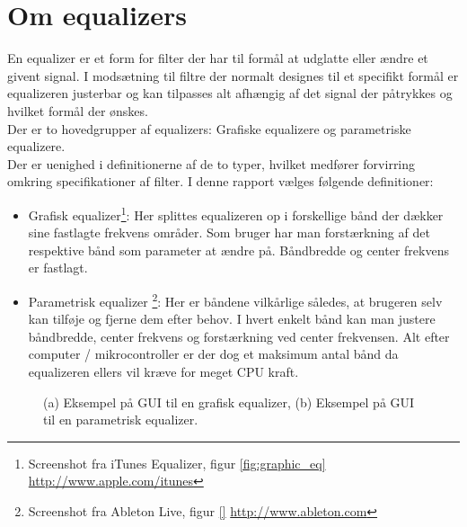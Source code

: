 \section{Om equalizers}\label{sec:equalizer}

En equalizer er et form for filter der har til formål at udglatte eller ændre et givent signal. I modsætning til filtre der normalt designes til et specifikt formål er equalizeren justerbar og kan tilpasses alt afhængig af det signal der påtrykkes og hvilket formål der ønskes.\\

Der er to hovedgrupper af equalizers: Grafiske equalizere og parametriske equalizere.\\
Der er uenighed i definitionerne af de to typer, hvilket medfører forvirring omkring specifikationer af filter. I denne rapport vælges følgende definitioner:

\begin{itemize}
	\item Grafisk equalizer\footnote{Screenshot fra iTunes Equalizer, figur \ref{fig:graphic_eq} \url{http://www.apple.com/itunes}}: Her splittes equalizeren op i forskellige bånd der dækker sine fastlagte frekvens områder. Som bruger har man forstærkning af det respektive bånd som parameter at ændre på. Båndbredde og center frekvens er fastlagt.
	\item Parametrisk equalizer \footnote{Screenshot fra Ableton Live, figur \ref{} \url{http://www.ableton.com}}: Her er båndene vilkårlige således, at brugeren selv kan tilføje og fjerne dem efter behov. I hvert enkelt bånd kan man justere båndbredde, center frekvens og forstærkning ved center frekvensen. Alt efter computer / mikrocontroller er der dog et maksimum antal bånd da equalizeren ellers vil kræve for meget CPU kraft. 
\end{itemize}  

\begin{figure}[h]
	\centering
  	\caption{(a) Eksempel på GUI til en grafisk equalizer, (b) Eksempel på GUI til en parametrisk equalizer.}
	\label{fig:om_eq}
\end{figure}
\FloatBlock

